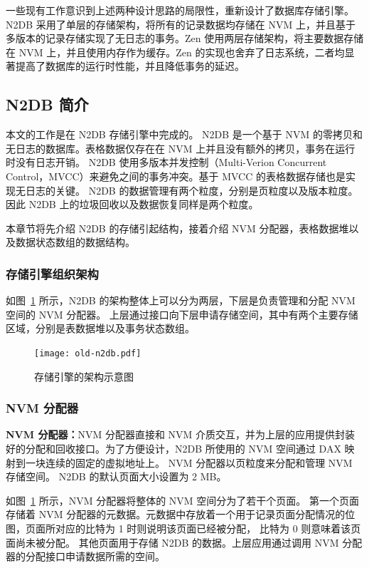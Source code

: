 一些现有工作意识到上述两种设计思路的局限性，重新设计了数据库存储引擎。N2DB 采用了单层的存储架构，将所有的记录数据均存储在 NVM 上，并且基于多版本的记录存储实现了无日志的事务\cite{liu_graduate}。Zen 使用两层存储架构，将主要数据存储在 NVM 上，并且使用内存作为缓存。Zen 的实现也舍弃了日志系统，二者均显著提高了数据库的运行时性能，并且降低事务的延迟\cite{liu_zen_2021}。

\subsection{N2DB 简介}
\label{ssec:n2db}
本文的工作是在 N2DB 存储引擎中完成的。
N2DB 是一个基于 NVM 的零拷贝和无日志的数据库。表格数据仅存在在 NVM 上并且没有额外的拷贝，事务在运行时没有日志开销。
N2DB 使用多版本并发控制（Multi-Verion Concurrent Control，MVCC）来避免之间的事务冲突。基于 MVCC 的表格数据存储也是实现无日志的关键。
N2DB 的数据管理有两个粒度，分别是页粒度以及版本粒度。
因此 N2DB 上的垃圾回收以及数据恢复同样是两个粒度。

本章节将先介绍 N2DB 的存储引起结构，接着介绍 NVM 分配器，表格数据堆以及数据状态数组的数据结构。



\subsubsection{存储引擎组织架构}

如图~\ref{fig:n2db} 所示，N2DB 的架构整体上可以分为两层，下层是负责管理和分配 NVM 空间的 NVM 分配器。
上层通过接口向下层申请存储空间，其中有两个主要存储区域，分别是表数据堆以及事务状态数组。

\begin{figure}
    \centering
    \texttt{[image: old-n2db.pdf]}
    \caption{存储引擎的架构示意图}
    \label{fig:n2db}
\end{figure}

\subsubsection{NVM 分配器}
\label{ssec:nvm-alloc}
\textbf{NVM 分配器：}NVM 分配器直接和 NVM 介质交互，并为上层的应用提供封装好的分配和回收接口。为了方便设计，N2DB 所使用的 NVM 空间通过 DAX 映射到一块连续的固定的虚拟地址上。
NVM 分配器以页粒度来分配和管理 NVM 存储空间。
N2DB 的默认页面大小设置为 2 MB。

如图~\ref{fig:n2db} 所示，NVM 分配器将整体的 NVM 空间分为了若干个页面。
第一个页面存储着 NVM 分配器的元数据。元数据中存放着一个用于记录页面分配情况的位图，页面所对应的比特为 1 时则说明该页面已经被分配，
比特为 0 则意味着该页面尚未被分配。
其他页面用于存储 N2DB 的数据。上层应用通过调用 NVM 分配器的分配接口申请数据所需的空间。

